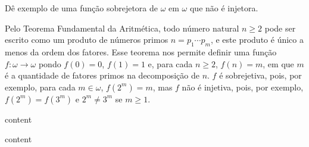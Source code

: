 \begin{exercicio}
	Dê exemplo de uma função sobrejetora de $\omega$ em $\omega$ que não é injetora.
\end{exercicio}
\begin{solucao}
	Pelo Teorema Fundamental da Aritmética, todo número natural $n\geq2$ pode ser escrito como um produto de números primos $n=p_1\cdots p_m$, e este produto é único a menos da ordem dos fatores. Esse teorema nos permite definir uma função $f:\omega\to\omega$ pondo $f(0)=0$, $f(1)=1$ e, para cada $n\geq2$, $f(n)=m$, em que $m$ é a quantidade de fatores primos na decomposição de $n$. $f$ é sobrejetiva, pois, por exemplo, para cada $m\in\omega$, $f(2^m)=m$, mas $f$ não é injetiva, pois, por exemplo, $f(2^m)=f(3^m)$ e $2^m\neq 3^m$ se $m\geq1$.
\end{solucao}

\begin{exercicio}
	content
\end{exercicio}
\begin{solucao}
	content
\end{solucao}

